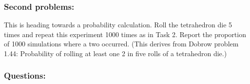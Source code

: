 \documentclass[
]{article}
\newenvironment{Shaded}{\begin{snugshade}}{\end{snugshade}}
\newcommand{\ControlFlowTok}[1]{\textcolor[rgb]{0.13,0.29,0.53}{\textbf{#1}}}
\newcommand{\DataTypeTok}[1]{\textcolor[rgb]{0.13,0.29,0.53}{#1}}
\newcommand{\DecValTok}[1]{\textcolor[rgb]{0.00,0.00,0.81}{#1}}
\newcommand{\KeywordTok}[1]{\textcolor[rgb]{0.13,0.29,0.53}{\textbf{#1}}}
\newcommand{\NormalTok}[1]{#1}
\newcommand{\OperatorTok}[1]{\textcolor[rgb]{0.81,0.36,0.00}{\textbf{#1}}}
\newcommand{\OtherTok}[1]{\textcolor[rgb]{0.56,0.35,0.01}{#1}}
\newcommand{\StringTok}[1]{\textcolor[rgb]{0.31,0.60,0.02}{#1}}
\begin{document}
\hypertarget{second-problems}{%
\subsubsection{Second problems:}\label{second-problems}}

This is heading towards a probability calculation. Roll the tetrahedron
die 5 times and repeat this experiment 1000 times as in Task 2. Report
the proportion of 1000 simulations where a two occurred. (This derives
from Dobrow problem 1.44: Probability of rolling at least one 2 in five
rolls of a tetrahedron die.)

\begin{Shaded}
\end{Shaded}

\hypertarget{questions-2}{%
\subsubsection{Questions:}\label{questions-2}}
\end{document}
